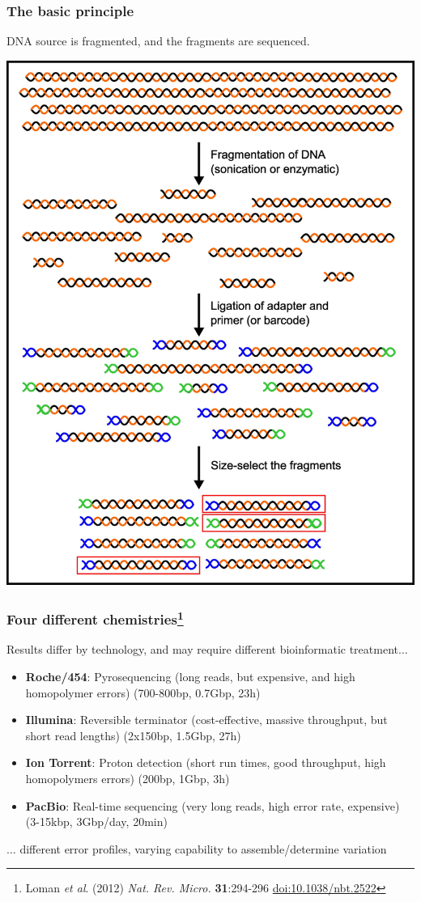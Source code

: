 \begin{frame}
  \frametitle{The basic principle}
  DNA source is fragmented, and the fragments are sequenced. \\
  \begin{center}
    \includegraphics[height=0.7\textheight]{images/library_preparation}
  \end{center}      
\end{frame}

\begin{frame}
  \frametitle{Four different chemistries\footnote{\tiny{Loman \textit{et al}. (2012) \textit{Nat. Rev. Micro.} \textbf{31}:294-296 \href{http://dx.doi.org/10.1038/nbt.2522}{doi:10.1038/nbt.2522}}}}
  Results differ by technology, and may require different bioinformatic treatment$\ldots$
  \begin{itemize}
    \item \textbf{Roche/454}: Pyrosequencing (long reads, but expensive, and high homopolymer errors) (700-800bp, 0.7Gbp, 23h)
    \item \textbf{Illumina}: Reversible terminator (cost-effective, massive throughput, but short read lengths) (2x150bp, 1.5Gbp, 27h)
    \item \textbf{Ion Torrent}: Proton detection (short run times, good throughput, high homopolymers errors) (200bp, 1Gbp, 3h)
    \item \textbf{PacBio}: Real-time sequencing (very long reads, high error rate, expensive) (3-15kbp, 3Gbp/day, 20min)
  \end{itemize}
  $\ldots$ different error profiles, varying capability to assemble/determine variation
\end{frame}

